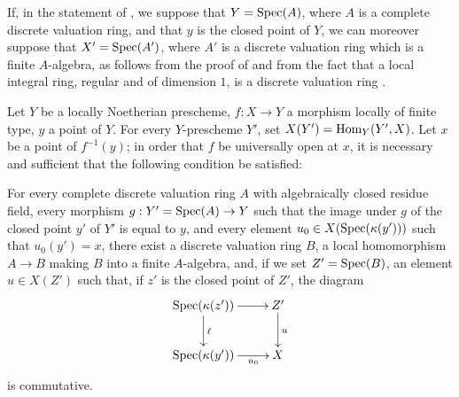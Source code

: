 \begin{remark}[14.5.7]
\label{IV.14.5.7}
If, in the statement of , we suppose that $Y=\operatorname{Spec}(A)$, where $A$ is a complete discrete valuation ring, and that $y$ is the closed point of $Y$, we can moreover suppose that $X'=\operatorname{Spec}(A')$, where $A'$ is a discrete valuation ring which is a finite $A$-algebra, as follows from the proof of  and from the fact that a local integral ring, regular and of dimension $1$, is a discrete valuation ring .
\end{remark}

\begin{proposition}[14.5.8]
\label{IV.14.5.8}
Let $Y$ be a locally Noetherian prescheme, $f:X\to Y$ a morphism locally of finite type, $y$ a point of $Y$.
For every $Y$-prescheme $Y'$, set $X(Y')=\operatorname{Hom}_Y(Y',X)$.
Let $x$ be a point of $f^{-1}(y)$; in order that $f$ be universally open at $x$, it is necessary and sufficient that the following condition be satisfied:

For every complete discrete valuation ring $A$ with algebraically closed residue field, every morphism $g:Y'=\operatorname{Spec}(A)\to Y$ such that the image under $g$ of the closed point $y'$ of $Y'$ is equal to $y$, and every element $u_0\in X(\operatorname{Spec}(\kappa(y')))$ such that $u_0(y')=x$, there exist a discrete valuation ring $B$, a local homomorphism $A\to B$ making $B$ into a finite $A$-algebra, and, if we set $Z'=\operatorname{Spec}(B)$, an element $u\in X(Z')$ such that, if $z'$ is the closed point of $Z'$, the diagram
\[
  \xymatrix{
    \Spec(\kappa(z')) \ar[r] \ar[d]^{\ell} & Z' \ar[d]^{u} \\
    \Spec(\kappa(y')) \ar[r]_-{u_0} & X
  }
\]
is commutative.
\end{proposition}


